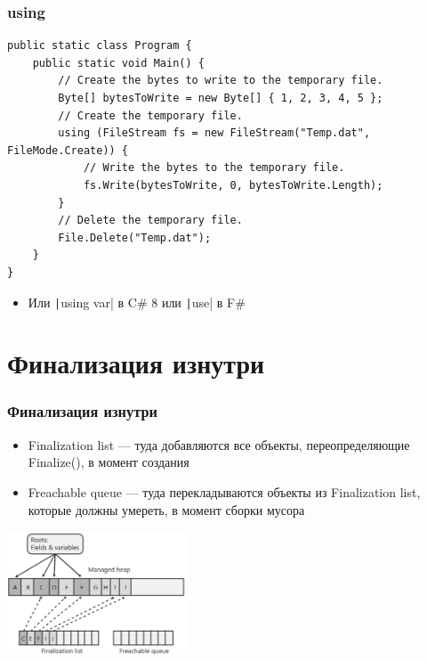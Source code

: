 \documentclass[xetex,mathserif,serif]{beamer}
\begin{document}
    \begin{frame}[fragile]
        \frametitle{using}
        \begin{scriptsize}
            \begin{verbatim}
public static class Program {
    public static void Main() {
        // Create the bytes to write to the temporary file.
        Byte[] bytesToWrite = new Byte[] { 1, 2, 3, 4, 5 };
        // Create the temporary file.
        using (FileStream fs = new FileStream("Temp.dat", FileMode.Create)) {
            // Write the bytes to the temporary file.
            fs.Write(bytesToWrite, 0, bytesToWrite.Length);
        }
        // Delete the temporary file.
        File.Delete("Temp.dat");
    }
}
            \end{verbatim}
        \end{scriptsize}
        \begin{itemize}
            \item Или \texttt|using var| в C\# 8 или \texttt|use| в F\#
        \end{itemize}
    \end{frame}

    \section{Финализация изнутри}

    \begin{frame}
        \frametitle{Финализация изнутри}
        \begin{itemize}
            \item Finalization list --- туда добавляются все объекты, переопределяющие Finalize(), в момент создания
            \item Freachable queue --- туда перекладываются объекты из Finalization list, которые должны умереть, в момент сборки мусора
        \end{itemize}
        \begin{center}
            \includegraphics[width=0.4\textwidth]{finalizationList.png}
        \end{center}
    \end{frame}
\end{document}
